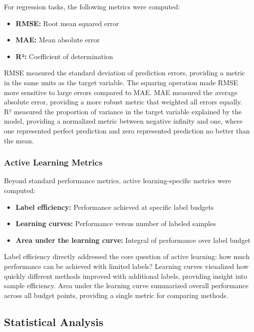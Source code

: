 \documentclass[conference]{IEEEtran}
\begin{document}
For regression tasks, the following metrics were computed:

\begin{itemize}
\item \textbf{RMSE:} Root mean squared error
\item \textbf{MAE:} Mean absolute error
\item \textbf{R²:} Coefficient of determination
\end{itemize}

RMSE measured the standard deviation of prediction errors, providing a metric in the same units as the target variable. The squaring operation made RMSE more sensitive to large errors compared to MAE. MAE measured the average absolute error, providing a more robust metric that weighted all errors equally. R² measured the proportion of variance in the target variable explained by the model, providing a normalized metric between negative infinity and one, where one represented perfect prediction and zero represented prediction no better than the mean.

\subsubsection{Active Learning Metrics}

Beyond standard performance metrics, active learning-specific metrics were computed:

\begin{itemize}
\item \textbf{Label efficiency:} Performance achieved at specific label budgets
\item \textbf{Learning curves:} Performance versus number of labeled samples
\item \textbf{Area under the learning curve:} Integral of performance over label budget
\end{itemize}

Label efficiency directly addressed the core question of active learning: how much performance can be achieved with limited labels? Learning curves visualized how quickly different methods improved with additional labels, providing insight into sample efficiency. Area under the learning curve summarized overall performance across all budget points, providing a single metric for comparing methods.

\subsection{Statistical Analysis}
\end{document}

